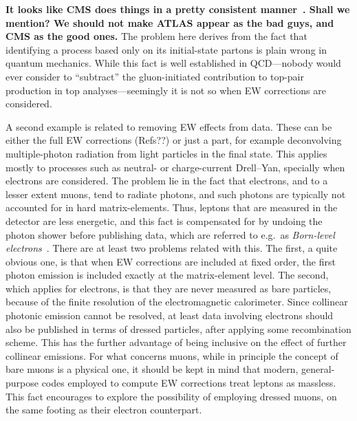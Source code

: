 {\bf It looks like CMS does things in a pretty consistent manner~\cite{Sirunyan:2018owv, CMS:2014jea}. Shall we mention? We should
not make ATLAS appear as the bad guys, and CMS as the good ones.} The problem here derives from the fact 
that identifying a process based only on its
initial-state partons is plain wrong in quantum mechanics. While this fact is well established in QCD---nobody would ever
consider to \enquote{subtract} the gluon-initiated contribution to top-pair production in top analyses---seemingly it is not so
when EW corrections are considered.

A second example is related to removing EW effects from data. These can be either the full EW corrections (Refs??) 
or just a part, for example deconvolving multiple-photon radiation from light particles in the final state. This applies mostly
to processes such as neutral- or charge-current Drell--Yan, specially when electrons are considered. The problem lie in the fact that
 electrons, and to a lesser extent muons, tend to radiate photons, and such photons are typically not accounted
for in hard matrix-elements. Thus, leptons that are measured in the detector are less energetic, and this fact is compensated for
by undoing the photon shower before publishing data, which are referred to e.g.\ as \emph{Born-level electrons}~\cite{}. There are
at least two 
problems related with this. The first, a quite obvious one, is that when EW corrections
are included at fixed order, the first photon emission is included exactly at the matrix-element level. The second, which
applies for electrons, is that they are never measured as bare particles, because of the finite resolution 
of the electromagnetic calorimeter. Since collinear photonic emission cannot be resolved, at least data 
involving electrons should also be published
in terms of dressed particles, after applying some recombination scheme. This has the further advantage of being 
inclusive on the effect of further collinear emissions. For what concerns muons, while in principle
the concept of bare muons is a physical one, it should be kept in mind that modern, general-purpose codes employed to
compute EW corrections treat leptons as massless. This fact encourages to explore the possibility of employing dressed
muons, on the same footing as their electron counterpart.


